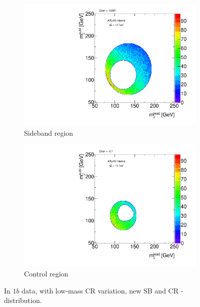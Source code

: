 \begin{figure}[htbp!]
\centering
\captionsetup{justification=centering}
    \begin{subfigure}[b]{0.45\textwidth}
        \includegraphics[width=\textwidth,angle=-90]{figures/boosted/Syst_CRSB/CR_Low_Sideband_OneTag_mH0H1.pdf}
        \caption{Sideband region}
        \label{CRSB:CR_Low_SB}
    \end{subfigure}
    \quad
    \begin{subfigure}[b]{0.45\textwidth}
        \includegraphics[width=\textwidth,angle=-90]{figures/boosted/Syst_CRSB/CR_Low_Control_OneTag_mH0H1.pdf}
        \caption{Control region}
        \label{CRSB:CR_Low_CR}
    \end{subfigure}
\caption{In $1b$ data, with low-mass CR variation, new SB and CR \mleadJ-\msublJ distribution.}
\label{CRSB:CR_Low}
\end{figure}



